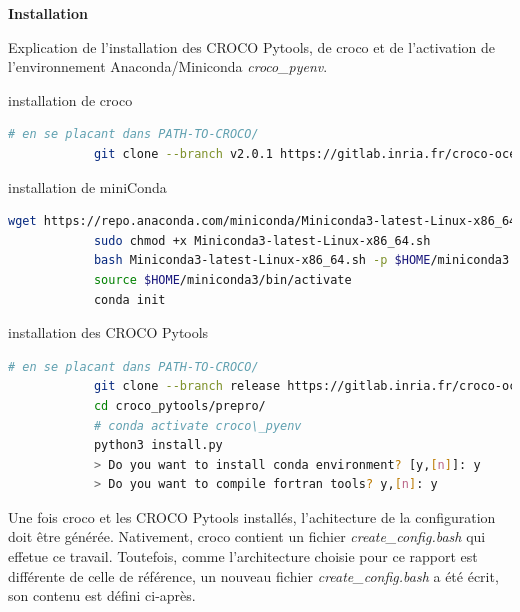 \documentclass[10pt,a4paper,titlepage]{article}
\begin{document}
    \textbf{Installation}
    
    Explication de l'installation des CROCO Pytools, de croco et de l'activation de l'environnement Anaconda/Miniconda \textit{croco\_pyenv}.
    
    \begin{codeEnv}{installation de croco}
        \begin{lstlisting}[language=bash]
            # en se placant dans PATH-TO-CROCO/
            git clone --branch v2.0.1 https://gitlab.inria.fr/croco-ocean/croco.git croco-v2.0.1
        \end{lstlisting}
    \end{codeEnv}
    
    \begin{codeEnv}{installation de miniConda}
        \begin{lstlisting}[language=bash]
            wget https://repo.anaconda.com/miniconda/Miniconda3-latest-Linux-x86_64.sh
            sudo chmod +x Miniconda3-latest-Linux-x86_64.sh
            bash Miniconda3-latest-Linux-x86_64.sh -p $HOME/miniconda3
            source $HOME/miniconda3/bin/activate
            conda init
        \end{lstlisting}
    \end{codeEnv}
    
    \begin{codeEnv}{installation des CROCO Pytools}
        \begin{lstlisting}[language=bash]
            # en se placant dans PATH-TO-CROCO/
            git clone --branch release https://gitlab.inria.fr/croco-ocean/croco_pytools.git
            cd croco_pytools/prepro/
            # conda activate croco\_pyenv
            python3 install.py
            > Do you want to install conda environment? [y,[n]]: y
            > Do you want to compile fortran tools? y,[n]: y
        \end{lstlisting}
    \end{codeEnv}
    
    Une fois croco et les CROCO Pytools installés, l'achitecture de la configuration doit être générée. Nativement, croco contient un fichier \textit{create\_config.bash} qui effetue ce travail. Toutefois, comme l'architecture choisie pour ce rapport est différente de celle de référence, un nouveau fichier \textit{create\_config.bash} a été écrit, son contenu est défini ci-après.
    
\end{document}
